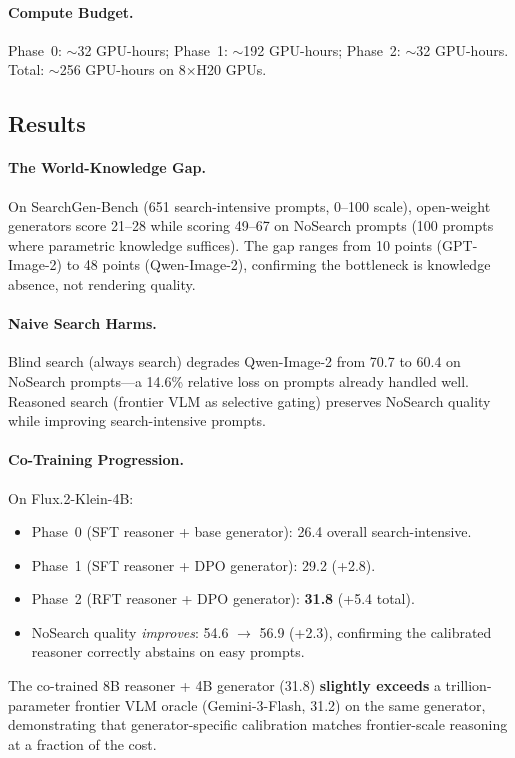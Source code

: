 \documentclass[11pt,a4paper]{article}
\begin{document}
\paragraph{Compute Budget.} Phase~0: ${\sim}$32 GPU-hours; Phase~1: ${\sim}$192 GPU-hours; Phase~2: ${\sim}$32 GPU-hours. Total: ${\sim}$256 GPU-hours on 8$\times$H20 GPUs.

\subsection{Results}

\paragraph{The World-Knowledge Gap.} On SearchGen-Bench (651 search-intensive prompts, 0--100 scale), open-weight generators score 21--28 while scoring 49--67 on NoSearch prompts (100 prompts where parametric knowledge suffices). The gap ranges from 10 points (GPT-Image-2) to 48 points (Qwen-Image-2), confirming the bottleneck is knowledge absence, not rendering quality.

\paragraph{Naive Search Harms.} Blind search (always search) degrades Qwen-Image-2 from 70.7 to 60.4 on NoSearch prompts---a 14.6\% relative loss on prompts already handled well. Reasoned search (frontier VLM as selective gating) preserves NoSearch quality while improving search-intensive prompts.

\paragraph{Co-Training Progression.} On Flux.2-Klein-4B:
\begin{itemize}
\item Phase~0 (SFT reasoner + base generator): 26.4 overall search-intensive.
\item Phase~1 (SFT reasoner + DPO generator): 29.2 (+2.8).
\item Phase~2 (RFT reasoner + DPO generator): \textbf{31.8} (+5.4 total).
\item NoSearch quality \emph{improves}: 54.6 $\to$ 56.9 (+2.3), confirming the calibrated reasoner correctly abstains on easy prompts.
\end{itemize}
The co-trained 8B reasoner + 4B generator (31.8) \textbf{slightly exceeds} a trillion-parameter frontier VLM oracle (Gemini-3-Flash, 31.2) on the same generator, demonstrating that generator-specific calibration matches frontier-scale reasoning at a fraction of the cost.
\end{document}
